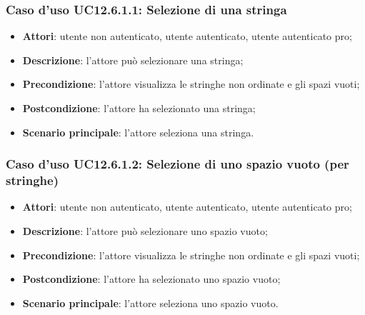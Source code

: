 \subsubsection{Caso d'uso UC12.6.1.1: Selezione di una stringa}
\begin{itemize}
\item \textbf{Attori}: utente non autenticato, utente autenticato, utente autenticato pro;
\item \textbf{Descrizione}: l'attore può selezionare una stringa;
\item \textbf{Precondizione}: l'attore visualizza le stringhe non ordinate e gli spazi vuoti;
\item \textbf{Postcondizione}: l'attore ha selezionato una stringa;
\item \textbf{Scenario principale}: l'attore seleziona una stringa.
\end{itemize}

\subsubsection{Caso d'uso UC12.6.1.2: Selezione di uno spazio vuoto (per stringhe)}
\begin{itemize}
\item \textbf{Attori}: utente non autenticato, utente autenticato, utente autenticato pro;
\item \textbf{Descrizione}: l'attore può selezionare uno spazio vuoto;
\item \textbf{Precondizione}: l'attore visualizza le stringhe non ordinate e gli spazi vuoti;
\item \textbf{Postcondizione}: l'attore ha selezionato uno spazio vuoto;
\item \textbf{Scenario principale}: l'attore seleziona uno spazio vuoto.
\end{itemize}

